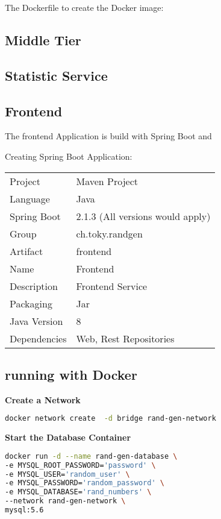 The Dockerfile to create the Docker image:


\subsection{Middle Tier}




\subsection{Statistic Service}


\subsection{Frontend}
The frontend Application is build with Spring Boot and 

Creating Spring Boot Application:
\begin{tabbing}
\begin{tabular}{ll}
Project & Maven Project \\
Language & Java \\
Spring Boot & 2.1.3 (All versions would apply) \\
Group & ch.toky.randgen \\
Artifact & frontend \\
Name & Frontend \\
Description & Frontend Service \\
Packaging & Jar \\
Java Version & 8 \\
Dependencies & Web, Rest Repositories
\end{tabular}
\end{tabbing}


\subsection{running with Docker}

\textbf{Create a Network}
\begin{lstlisting}[language=Bash]
docker network create  -d bridge rand-gen-network
\end{lstlisting}

\textbf{Start the Database Container}

\begin{lstlisting}[language=Bash]
docker run -d --name rand-gen-database \
-e MYSQL_ROOT_PASSWORD='password' \
-e MYSQL_USER='random_user' \
-e MYSQL_PASSWORD='random_password' \
-e MYSQL_DATABASE='rand_numbers' \
--network rand-gen-network \
mysql:5.6
\end{lstlisting}

